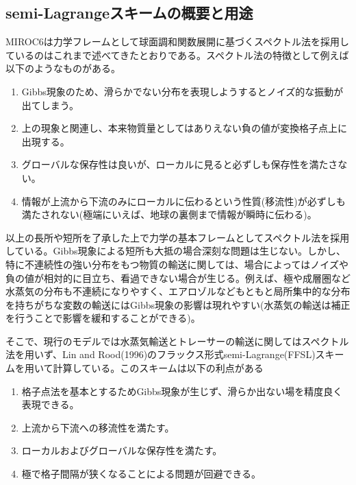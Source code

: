 \documentclass{jsbook}
\begin{document}
\subsection{semi-Lagrangeスキームの概要と用途}
MIROC6は力学フレームとして球面調和関数展開に基づくスペクトル法を採用しているのはこれまで述べてきたとおりである。スペクトル法の特徴として例えば以下のようなものがある。
\begin{enumerate}
\item Gibbs現象のため、滑らかでない分布を表現しようするとノイズ的な振動が出てしまう。
\item 上の現象と関連し、本来物質量としてはありえない負の値が変換格子点上に出現する。
\item グローバルな保存性は良いが、ローカルに見ると必ずしも保存性を満たさない。
\item 情報が上流から下流のみにローカルに伝わるという性質(移流性)が必ずしも満たされない(極端にいえば、地球の裏側まで情報が瞬時に伝わる)。
\end{enumerate}
以上の長所や短所を了承した上で力学の基本フレームとしてスペクトル法を採用している。Gibbs現象による短所も大抵の場合深刻な問題は生じない。しかし、特に不連続性の強い分布をもつ物質の輸送に関しては、場合によってはノイズや負の値が相対的に目立ち、看過できない場合が生じる。例えば、極や成層圏など水蒸気の分布も不連続になりやすく、エアロゾルなどもともと局所集中的な分布を持ちがちな変数の輸送にはGibbs現象の影響は現れやすい(水蒸気の輸送は補正を行うことで影響を緩和することができる)。

そこで、現行のモデルでは水蒸気輸送とトレーサーの輸送に関してはスペクトル法を用いず、Lin and Rood(1996)のフラックス形式semi-Lagrange(FFSL)スキームを用いて計算している。このスキームは以下の利点がある
\begin{enumerate}
\item 格子点法を基本とするためGibbs現象が生じず、滑らか出ない場を精度良く表現できる。
\item 上流から下流への移流性を満たす。
\item ローカルおよびグローバルな保存性を満たす。
\item 極で格子間隔が狭くなることによる問題が回避できる。
\end{enumerate}
\end{document}

